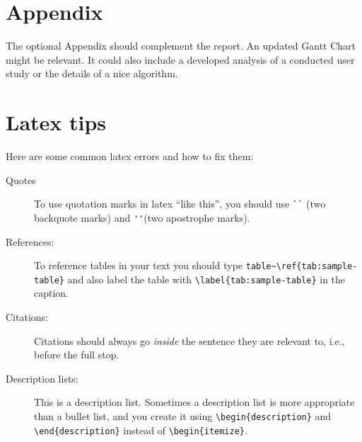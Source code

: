 \documentclass{article}
\begin{document}
\appendix

\section{Appendix}
The optional Appendix should complement the report. An updated Gantt Chart might be relevant. It could also include a developed analysis of a conducted user study or the details of a nice algorithm. 

{\color{blue}
\section{Latex tips}
Here are some common latex errors and how to fix them: 
\begin{description}
    \item[Quotes] To use quotation marks in latex ``like this'', you should use \verb+``+ (two backquote marks) and \verb+''+(two apostrophe marks). 
    \item[References:] To reference tables in your text you should type \verb+table~\ref{tab:sample-table}+ and also label the table with \verb+\label{tab:sample-table}+ in the caption. 
    \item[Citations: ] Citations should always go \emph{inside} the sentence they are relevant to, i.e., before the full stop. 
    \item[Description lists:] This is a description list. Sometimes a description list is more appropriate than a bullet list, and you create it using \verb+\begin{description}+ and \verb+\end{description}+ instead of \verb+\begin{itemize}+.
\end{description}
}

\end{document}
